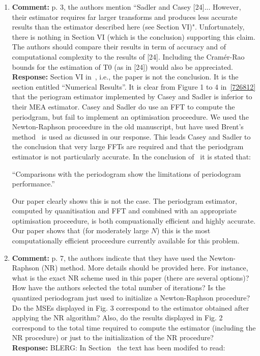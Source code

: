 \documentclass[a4paper,10pt]{article}
\begin{document}
\begin{enumerate}
\item\textbf{Comment:}
p. 3, the authors mention “Sadler and Casey [24]... However, their estimator
requires far larger transforms and produces less accurate results than the estimator
described here (see Section VI)". Unfortunately, there is nothing in
Section VI (which is the conclusion) supporting this claim. The authors should
compare their results in term of accuracy and of computational complexity to
the results of [24]. Including the Cramér-Rao bounds for the estimation of T0
(as in [24]) would also be appreciated.
\\
\textbf{Response:}
Section VI in~\cite{726812}, i.e., the paper is not the conclusion.  It is the section entitled ``Numerical Results''.  It is clear from Figure 1 to 4 in~\ref{726812} that the periogram estimator implemented by Casey and Sadler is inferior to their MEA estimator.  Casey and Sadler do use an FFT to compute the periodgram, but fail to implement an optimisation proceedure.  We used the Newton-Raphson proceedure in the old manuscript, but have used Brent's method~\cite{Brent_opt_no_derivs_1973} is used as dicussed in our response.  This leads Casey and Sadler to the conclusion that very large FFTs are required and that the periodgram estimator is not particularly accurate.  In the conclusion of~\cite{726812} it is stated that:

``Comparisons with the periodogram show the limitations of
periodogram performance.''

Our paper clearly shows this is not the case.  The periodgram estimator, computed by quanitisation and FFT and combined with an appropriate optimisation proceedure, is both compuationally efficient and highly accurate.  Our paper shows that (for moderately large $N$) this is the most computationally efficient proceedure currently available for this problem.



\item\textbf{Comment:}
p. 7, the authors indicate that they have used the Newton-Raphson (NR)
method. More details should be provided here. For instance, what is the exact
NR scheme used in this paper (there are several options)? How have the
authors selected the total number of iterations? Is the quantized periodogram
just used to initialize a Newton-Raphson procedure? Do the MSEs displayed
in Fig. 3 correspond to the estimator obtained after applying the NR algorithm?
Also, do the results displayed in Fig. 2 correspond to the total time
required to compute the estimator (including the NR procedure) or just to the
initialization of the NR procedure?
\\
\textbf{Response:}
BLERG: In Section~ the text has been modifed to read:


\end{enumerate}
\end{document}
